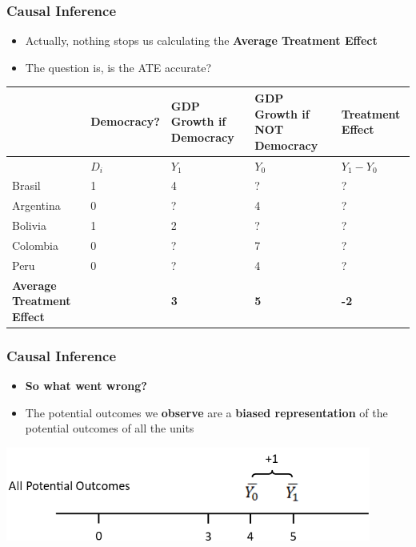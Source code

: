 \documentclass[xcolor=x11names,compress]{beamer}\usepackage[]{graphicx}\usepackage[]{color}
\renewcommand{\(}{\begin{columns}}
\renewcommand{\)}{\end{columns}}
\newcommand{\<}[1]{\begin{column}{#1}}
\renewcommand{\>}{\end{column}}
\begin{document}
\begin{frame}
\frametitle{Causal Inference}
\begin{itemize}
\item Actually, nothing stops us calculating the \textbf{Average Treatment Effect}
\item The question is, is the ATE accurate?
\end{itemize}
\footnotesize
\begin{table}[htbp]
  \centering
    \begin{tabular}{|p{1.8cm}|p{1.8cm}|p{2cm}|p{2cm}|p{2cm}|}
    \hline
          & \multicolumn{1}{p{1.8cm}|}{Democracy?} & \multicolumn{1}{p{2cm}|}{GDP Growth if Democracy} & \multicolumn{1}{p{2.2cm}|}{GDP Growth if NOT Democracy} & \textbf{Treatment Effect} \bigstrut\\
    \hline
          & \multicolumn{1}{p{1.8cm}|}{$D_i$} & \multicolumn{1}{p{2cm}|}{$Y_1$} & \multicolumn{1}{p{2.2cm}|}{$Y_0$} & \multicolumn{1}{p{1.8cm}|}{$Y_{1} - Y_{0}$} \bigstrut\\
    \hline
    Brasil & 1 & 4     & ?      & ? \bigstrut\\
    \hline
    Argentina & 0 & ?    & 4      & ? \bigstrut\\
    \hline
    Bolivia & 1 & 2     & ?     & ? \bigstrut\\
    \hline
    Colombia & 0 &  ?   & 7    & ? \bigstrut\\
    \hline
    Peru & 0 & ?     & 4     & ? \bigstrut\\
    \hline
    \textbf{Average Treatment Effect} & & \textbf{3} & \textbf{5} & \textbf{-2} \bigstrut\\
    \hline
    \end{tabular}%
  \label{tab:addlabel}%
\end{table}%
\normalsize
\end{frame}

\begin{frame}
\frametitle{Causal Inference}
\begin{itemize}
\item \textbf{So what went wrong?}
\pause
\item The potential outcomes we \textbf{observe} are a \textbf{biased representation} of the potential outcomes of all the units
\pause
\end{itemize}
\includegraphics[width=0.9\textwidth]{PO_number_line_1.png}
\end{frame}
\end{document}

